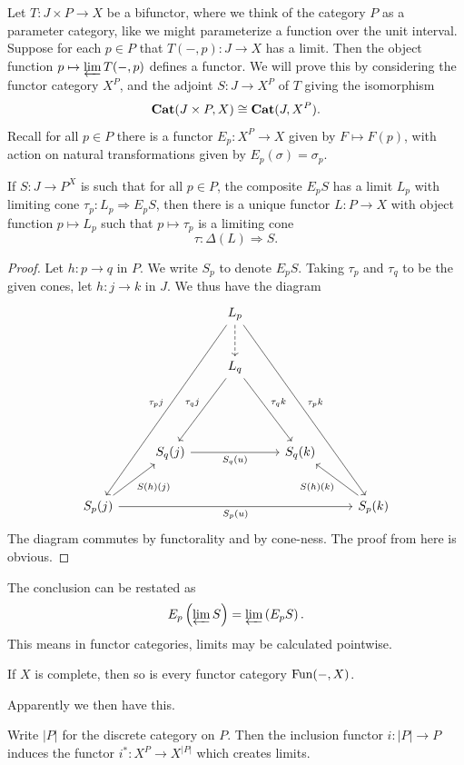 Let $T : J\times P \to X$ be a bifunctor, where we think of the category $P$ as a parameter category, like we might parameterize a function over the unit interval. Suppose for each $p\in P$ that $T(-,p): J \to X$ has a limit. Then the object function $p\mapsto \varprojlim T(-,p)$ defines a functor. We will prove this by considering the functor category $X^P$, and the adjoint $S : J \to X^P$ of $T$ giving the isomorphism
\[
	\mathbf{Cat} (J\times P,X)\cong \mathbf{Cat} (J,X^P)
.\]
Recall for all $p\in P$ there is a functor $E_p : X^P \to X$ given by $F\mapsto F(p)$, with action on natural transformations given by $E_p(\sigma )=\sigma _p$.

\begin{theorem}\label{thm:5.5}
	If $S : J \to P^X$ is such that for all $p\in P$, the composite $E_pS$ has a limit $L_p$ with limiting cone $\tau _p : L_p \Rightarrow E_pS$, then there is a unique functor $L : P \to X$ with object function $p\mapsto L_p$ such that $p\mapsto \tau _p$ is a limiting cone
	\[
		\tau : \Delta (L) \Rightarrow S
	.\]
\end{theorem}
\begin{proof}
	Let $h : p \to q$ in $P$. We write $S_p$ to denote $E_pS$. Taking $\tau _p$ and $\tau _q$ to be the given cones, let $h : j \to k$ in $J$. We thus have the diagram
	\[\begin{tikzcd}[row sep = 2.5em, column sep = 2.5em]
	 &  & L_p \ar[dashed, d] \ar[" \tau _pk ", ddddrr] \ar[" \tau _pj "', ddddll]  &  &  \\
	 &  & L_q \ar[" \tau _qk ", ddr] \ar[" \tau _qj "', ddl]  &  &  \\
	 &  &  &  &  \\
	 & S_q(j)\ar[" S_q(u) "', rr]  &  & S_q(k) &  \\
	S_p(j)\ar[" S_p(u) "', rrrr] \ar[" S(h)(j) "', ur]  &  &  &  & S_p(k)\ar[" S(h)(k) ", ul] 
	\end{tikzcd}\]
	The diagram commutes by functorality and by cone-ness. The proof from here is obvious.
\end{proof}

The conclusion can be restated as
\[
	E_p\left( \varprojlim S \right) =\varprojlim \left( E_pS \right) 
.\]
This means in functor categories, limits may be calculated pointwise.

\begin{corollary}\label{cor:5.3}
	If $X$ is complete, then so is every functor category $\operatorname{Fun}(-,X)$.
\end{corollary}
Apparently we then have this.
\begin{theorem}\label{thm:5.6}
	Write $\left| P \right| $ for the discrete category on $P$. Then the inclusion functor $i : \left| P \right|  \to P$ induces the functor $i^* : X^P \to X^{\left| P \right| } $ which creates limits.
\end{theorem}

